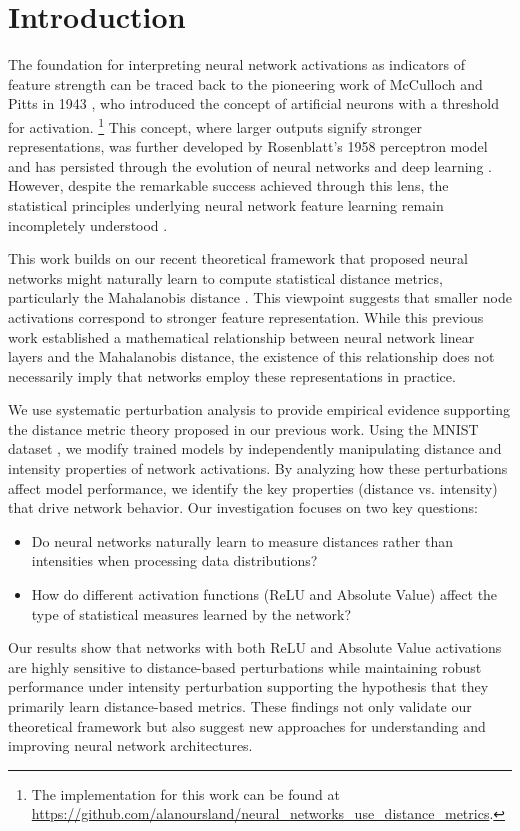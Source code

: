 \section{Introduction}

The foundation for interpreting neural network activations as indicators of feature strength can be traced back to the pioneering work of McCulloch and Pitts in 1943 \cite{mcculloch1943logical}, who introduced the concept of artificial neurons with a threshold for activation. \footnote{The implementation for this work can be found at \url{https://github.com/alanoursland/neural_networks_use_distance_metrics}.} This concept, where larger outputs signify stronger representations, was further developed by Rosenblatt's 1958 perceptron model \cite{rosenblatt1958perceptron} and has persisted through the evolution of neural networks and deep learning \cite{schmidhuber2015deep}. However, despite the remarkable success achieved through this lens, the statistical principles underlying neural network feature learning remain incompletely understood \cite{lipton2018mythos}. 

This work builds on our recent theoretical framework \cite{oursland2024interpreting} that proposed neural networks might naturally learn to compute statistical distance metrics, particularly the Mahalanobis distance \cite{mahalanobis1936generalized}. This viewpoint suggests that smaller node activations correspond to stronger feature representation. While this previous work established a mathematical relationship between neural network linear layers and the Mahalanobis distance, the existence of this relationship does not necessarily imply that networks employ these representations in practice. 

We use systematic perturbation analysis \cite{szegedy2013intriguing, goodfellow2014explaining} to provide empirical evidence supporting the distance metric theory proposed in our previous work. Using the MNIST dataset \cite{lecun1998gradient}, we modify trained models by independently manipulating distance and intensity properties of network activations. By analyzing how these perturbations affect model performance, we identify the key properties (distance vs. intensity) that drive network behavior. Our investigation focuses on two key questions:

\begin{itemize}
    \item Do neural networks naturally learn to measure distances rather than intensities when processing data distributions?
    \item How do different activation functions (ReLU and Absolute Value) affect the type of statistical measures learned by the network?
\end{itemize}

Our results show that networks with both ReLU and Absolute Value activations are highly sensitive to distance-based perturbations while maintaining robust performance under intensity perturbation supporting the hypothesis that they primarily learn distance-based metrics. These findings not only validate our theoretical framework but also suggest new approaches for understanding and improving neural network architectures.